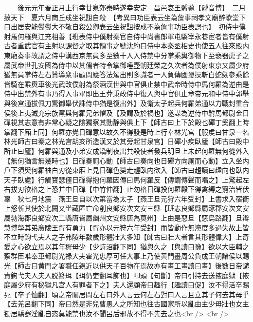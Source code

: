 　　後元元年春正月上行幸甘泉郊泰畤遂幸安定　昌邑哀王髆薨【髆音博】　二月赦天下　夏六月商丘成坐祝詛自殺　【考異曰功臣表云坐為詹事祠孝文廟醉歌堂下曰出居安能鬰鬰大不敬自殺公卿表云坐祝詛按成不為詹事功臣表誤也】　初侍中僕射馬何羅與江充相善【班表侍中僕射秦官自侍中尚書郎軍屯騶宰永巷宦者皆有僕射古者重武官有主射以課督之取其領事之號沈約曰侍中本秦丞相史也使五人往來殿内東廂奏事故謂之侍中漢西京無員多至數十人入侍禁中分掌乘輿御物下至䙝器虎子之屬武帝世孔安國為侍中以其儒者特令掌御唾壺朝廷榮之久次者為僕射東京又屬少府猶無員掌侍左右贊導衆事顧問應答法駕出則多識者一人負傳國璽操斬白蛇劒參乘餘皆騎在乘輿車後光武改僕射為祭酒漢世與中官俱止禁中武帝時侍中馬何羅為逆由是侍中出禁外有事乃得入事畢即出王莽秉政侍中復入與中官俱止章帝元和中侍中郭舉與後宫通拔佩刀驚御舉伏誅侍中猶是復出外】及衛太子起兵何羅弟通以力戰封重合侯後上夷滅充宗族黨與何羅兄弟懼及【及謂及於禍也】遂謀為逆侍中駙馬都尉金日磾視其志意有非常心疑之隂獨察其動静與俱上下【師古曰上下於殿也磾丁奚翻上時掌翻下廂上同】何羅亦覺日磾意以故久不得發是時上行幸林光宫【服䖍曰甘泉一名林光師古曰秦之林光宫胡亥所造漢又於其旁起甘泉宮】日磾小疾臥廬【師古曰殿中所止曰廬】何羅與通及小弟安成矯制夜出共殺使者發兵明旦上未起何羅無何從外入【無何猶言無幾時也】日磾奏厠心動【師古曰奏向也日磾方向厠而心動】立入坐内戶下須臾何羅䄂白刃從東廂上見日磾色變走趨臥内欲入【師古曰趨讀曰趣向也臥内天子臥處】行觸寶瑟僵日磾得抱何羅因傳曰馬何羅反【傳謂傳聲而唱之】上驚起左右拔刃欲格之上恐并中日磾【中竹仲翻】止勿格日磾投何羅殿下得禽縛之窮治皆伏辜　秋七月地震　燕王旦自以次第當為太子【燕王旦元狩六年受封】上書求入宿衛上怒斬其使於北闕又坐藏匿亡命削良鄉安次文安三縣【班志良鄉縣屬涿郡安次文安屬勃海郡良鄉安次二縣唐皆屬幽州文安縣唐為莫州】上由是惡旦【惡烏路翻】旦辯慧博學其弟廣陵王胥有勇力【胥亦以元狩六年受封】而皆動作無灋度多過失故上皆不立時鉤弋夫人之子弗陵年數歲形體壯大多知【師古曰壯大者言其形體偉大】上奇愛之心欲立焉以其年穉母少【少詩沼翻下同】猶與久之【與讀曰豫】欲以大臣輔之察群臣唯奉車都尉光禄大夫霍光忠厚可任大事上乃使黄門畫周公負成王朝諸侯以賜光【師古曰黄門之署職任親近以供天子百物在焉故亦有畫工畫讀曰畫】後數日帝譴責鉤弋夫人夫人脱簪珥【珥仍吏翻耳飾也】叩頭【句斷】帝曰引持去送掖庭獄【掖庭屬少府有秘獄凡宫人有罪者下之】夫人還顧帝曰趣行【趣讀曰促】汝不得活卒賜死【卒子恤翻】頃之帝閒居問左右曰外人言云何左右對曰人言且立其子何去其母乎【去羌呂翻下同】帝曰然是非兒曹愚人之所知也往古國家所以亂由主少母壯也女主獨居驕蹇淫亂自恣莫能禁也汝不聞呂后邪故不得不先去之也<br />
<br />
